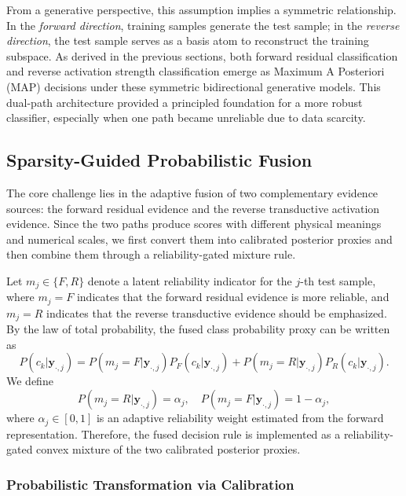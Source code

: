 \documentclass[10pt,comsoc]{IEEEtran}
\begin{document}
From a generative perspective, this assumption implies a symmetric relationship. In the \textit{forward direction}, training samples generate the test sample; in the \textit{reverse direction}, the test sample serves as a basis atom to reconstruct the training subspace. As derived in the previous sections, both forward residual classification and reverse activation strength classification emerge as Maximum A Posteriori (MAP) decisions under these symmetric bidirectional generative models. This dual-path architecture provided a principled foundation for a more robust classifier, especially when one path became unreliable due to data scarcity.

\subsection{Sparsity-Guided Probabilistic Fusion}

The core challenge lies in the adaptive fusion of two complementary evidence sources: the forward residual evidence and the reverse transductive activation evidence. Since the two paths produce scores with different physical meanings and numerical scales, we first convert them into calibrated posterior proxies and then combine them through a reliability-gated mixture rule.

Let $m_j \in \{F,R\}$ denote a latent reliability indicator for the $j$-th test sample, where $m_j=F$ indicates that the forward residual evidence is more reliable, and $m_j=R$ indicates that the reverse transductive evidence should be emphasized. By the law of total probability, the fused class probability proxy can be written as
\begin{equation}
	\label{eq:mixture_fusion}
	P(c_k|\mathbf{y}_{\cdot,j})
	=
	P(m_j=F|\mathbf{y}_{\cdot,j})P_F(c_k|\mathbf{y}_{\cdot,j})
	+
	P(m_j=R|\mathbf{y}_{\cdot,j})P_R(c_k|\mathbf{y}_{\cdot,j}).
\end{equation}
We define
\begin{equation}
	P(m_j=R|\mathbf{y}_{\cdot,j})=\alpha_j, 
	\quad
	P(m_j=F|\mathbf{y}_{\cdot,j})=1-\alpha_j,
\end{equation}
where $\alpha_j \in [0,1]$ is an adaptive reliability weight estimated from the forward representation. Therefore, the fused decision rule is implemented as a reliability-gated convex mixture of the two calibrated posterior proxies.

\subsubsection{Probabilistic Transformation via Calibration}
\end{document}
